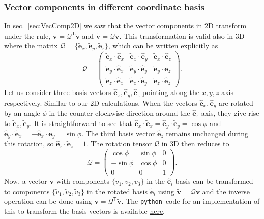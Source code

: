 \documentclass{article}
\def\eh{\hat{\mathbf{e}}}
\def\et{\tilde{\mathbf{e}}}
\def\ehx{\hat{\mathbf{e}}_x}
\def\ehy{\hat{\mathbf{e}}_y}
\def\ehz{\hat{\mathbf{e}}_z}
\def\etx{\tilde{\mathbf{e}}_x}
\def\ety{\tilde{\mathbf{e}}_y}
\def\etz{\tilde{\mathbf{e}}_z}
\def\v{\mathbf{v}}
\def\vt{\tilde{\mathbf{v}}}
\def\vts{\tilde{v}}
\def\Q{\mathcal{Q}}
\def\T{\mathsf{T}}
\begin{document}
\subsubsection*{Vector components in different coordinate basis}
In sec.~\ref{sec:VecComp2D} we saw that the vector components in 2D transform under the rule, $\v = \Q^\T \vt$ and $\vt = \Q \v$. This transformation is valid also in 3D where the matrix $\Q = \{ \et_x, \et_y, \et_z \}$, which can be written explicitly as
\[
  \Q  =
  \begin{pmatrix} 
  \etx \cdot \ehx & \etx \cdot \ehy & \etx \cdot \ehz\\
  \ety \cdot \ehx & \ety\cdot \ehy & \ety\cdot \ehz\\
  \etz \cdot \ehx & \etz\cdot \ehy & \etz\cdot \ehz
  \end{pmatrix}.
\]
Let us consider three basis vectors $\ehx, \ehy, \ehz$ pointing along the $x, y, z$-axis respectively. Similar to our 2D calculations, When the vectors $\ehx, \ehy$ are rotated by an angle $\phi$ in the counter-clockwise direction around the $\ehz$ axis, they give rise to $\etx, \ety$. It is straightforward to see that $\ehx\cdot\etx=\ehy\cdot\ety=\cos \phi$ and $\ehy\cdot\etx = -\ehx\cdot\ety = \sin \phi$. The third basis vector $\ehz$ remains unchanged during this rotation, so $\ehz\cdot\etz = 1$. The rotation tensor $\Q$ in 3D then reduces to
\[
  \Q  = 
  \begin{pmatrix} 
  \cos \phi & \sin \phi & 0 \\
  -\sin \phi & \cos \phi & 0 \\
  0 & 0 & 1
  \end{pmatrix}.
\]
\noindent Now, a vector $\v$ with components $\{ v_1, v_2, v_3 \}$ in the $\eh_i$ basis can be transformed to components $\{ \vts_1, \vts_2, \vts_3 \}$ in the rotated basis $\et_i$ using $\vt = \Q \v$  and the inverse operation can be done using  $\v = \Q^\T \vt$. The \texttt{python}--code for an implementation of this to transform the basis vectors is available \href{}{here}.
\end{document}
